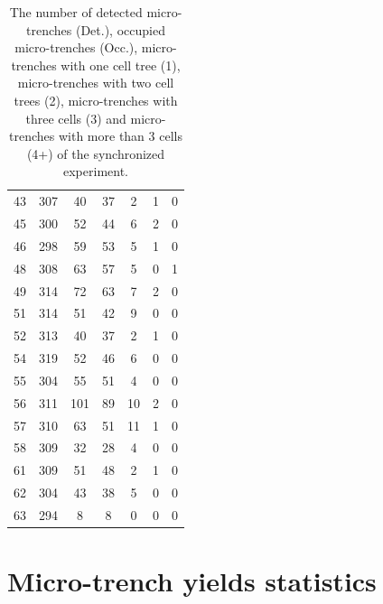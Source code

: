 \documentclass[pdftex,12pt,a4paper]{report}
\begin{document}
\begin{appendices}
\begin{table}[H]
\begin{tabular}[t]{ c | c | c | c | c | c | c }
43 & 307 & 40 & 37 & 2 & 1 & 0
\\
45 & 300 & 52 & 44 & 6 & 2 & 0
\\
46 & 298 & 59 & 53 & 5 & 1 & 0
\\
48 & 308 & 63 & 57 & 5 & 0 & 1
\\
49 & 314 & 72 & 63 & 7 & 2 & 0
\\
51 & 314 & 51 & 42 & 9 & 0 & 0
\\
52 & 313 & 40 & 37 & 2 & 1 & 0
\\
54 & 319 & 52 & 46 & 6 & 0 & 0
\\
55 & 304 & 55 & 51 & 4 & 0 & 0
\\
56 & 311 & 101 & 89 & 10 & 2 & 0
\\
57 & 310 & 63 & 51 & 11 & 1 & 0
\\
58 & 309 & 32 & 28 & 4 & 0 & 0
\\
61 & 309 & 51 & 48 & 2 & 1 & 0
\\
62 & 304 & 43 & 38 & 5 & 0 & 0
\\
63 & 294 & 8 & 8 & 0 & 0 & 0
\\
\hline
\end{tabular}
\caption[The occupancy statistics of the synchronized experiment]{The number of detected micro-trenches (Det.), occupied micro-trenches (Occ.), micro-trenches with one cell tree (1), micro-trenches with two cell trees (2), micro-trenches with three cells (3) and micro-trenches with more than 3 cells (4+) of the synchronized experiment.}
\end{table}
\label{table:occupancy_statistics_syn}

\section{Micro-trench yields statistics}
\label{section:micro_trench_yields_statistics}



\end{appendices}
\end{document}
